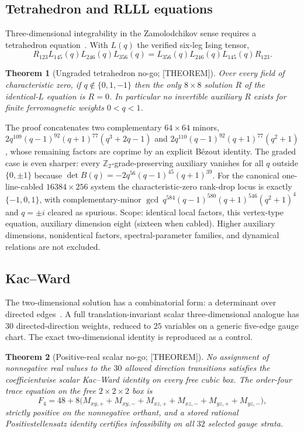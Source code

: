 \documentclass[11pt]{article}
\newtheorem{theorem}{Theorem}[section]
\theoremstyle{definition}
\newcommand{\Zb}{\mathbb{Z}}
\begin{document}
\subsection{Tetrahedron and RLLL equations}\label{sec:tetra}
Three-dimensional integrability in the Zamolodchikov sense requires a tetrahedron
equation~\cite{zamolodchikov1980,zamolodchikov1981,baxter1986}. With $L(q)$ the verified six-leg
Ising tensor,
\[
R_{123}L_{145}(q)L_{246}(q)L_{356}(q)=L_{356}(q)L_{246}(q)L_{145}(q)R_{123}.
\]

\begin{theorem}[Ungraded tetrahedron no-go; {[THEOREM]}]\label{thm:tetra}
Over every field of characteristic zero, if $q\notin\{0,1,-1\}$ then the only $8\times8$ solution
$R$ of the identical-$L$ equation is $R=0$. In particular no invertible auxiliary $R$ exists for
finite ferromagnetic weights $0<q<1$.
\end{theorem}

The proof concatenates two complementary $64\times64$ minors,
$2q^{109}(q-1)^{92}(q+1)^{77}(q^3+2q-1)$ and $2q^{110}(q-1)^{92}(q+1)^{77}(q^2+1)$, whose remaining
factors are coprime by an explicit B\'ezout identity. The graded case is even sharper: every
$\Zb_2$-grade-preserving auxiliary vanishes for all $q$ outside $\{0,\pm1\}$ because
$\det B(q)=-2q^{56}(q-1)^{45}(q+1)^{39}$. For the canonical one-line-cabled $16384\times256$ system
the characteristic-zero rank-drop locus is exactly $\{-1,0,1\}$, with complementary-minor
$\gcd\ q^{584}(q-1)^{580}(q+1)^{546}(q^2+1)^4$ and $q=\pm i$ cleared as spurious. Scope: identical
local factors, this vertex-type equation, auxiliary dimension eight (sixteen when cabled). Higher
auxiliary dimensions, nonidentical factors, spectral-parameter families, and dynamical relations are
not excluded.

\subsection{Kac--Ward}\label{sec:kw}
The two-dimensional solution has a combinatorial form: a determinant over directed
edges~\cite{kacward1952}. A full translation-invariant scalar three-dimensional analogue has $30$
directed-direction weights, reduced to $25$ variables on a generic five-edge gauge chart. The exact
two-dimensional identity is reproduced as a control.

\begin{theorem}[Positive-real scalar no-go; {[THEOREM]}]\label{thm:kwpos}
No assignment of nonnegative real values to the $30$ allowed direction transitions satisfies the
coefficientwise scalar Kac--Ward identity on every free cubic box. The order-four trace equation on
the free $2\times2\times2$ box is
\[
F_4=48+8\bigl(M_{xy,+}+M_{xy,-}+M_{xz,+}+M_{xz,-}+M_{yz,+}+M_{yz,-}\bigr),
\]
strictly positive on the nonnegative orthant, and a stored rational Positivstellensatz identity
certifies infeasibility on all $32$ selected gauge strata.
\end{theorem}
\end{document}
